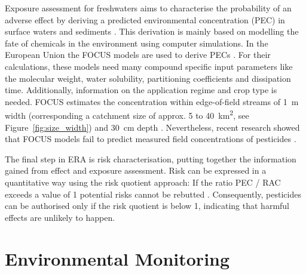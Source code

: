 Exposure assessment for freshwaters aims to characterise the probability of an adverse effect by deriving a predicted environmental concentration (PEC) in surface waters and sediments \citep{newman_fundamentals_2015}. 
This derivation is mainly based on modelling the fate of chemicals in the environment using computer simulations. 
In the European Union the FOCUS models are used to derive PECs \citep{focus_focus_2001, efsa_guidance_2013}.
For their calculations, these models need many compound specific input parameters like the molecular weight, water solubility, partitioning coefficients and dissipation time. 
Additionally, information on the application regime and crop type is needed. 
FOCUS estimates the concentration within edge-of-field streams of 1~m width (corresponding a catchment size of approx. 5 to 40~km\textsuperscript{2}, see Figure~\ref{fig:size_width}) and 30~cm depth \citep{erlacher_regulation_2011}. 
Nevertheless, recent research showed that FOCUS models fail to predict measured field concentrations of pesticides \citep{knabel_regulatory_2012, knabel_fungicide_2014}. 

The final step in ERA is risk characterisation, putting together the information gained from effect and exposure assessment. 
Risk can be expressed in a quantitative way using the risk quotient approach: If the ratio PEC / RAC exceeds a value of 1 potential risks cannot be rebutted \citep{efsa_guidance_2013, suter_ecological_2007,  solomon_probabilistic_2000}. 
Consequently, pesticides can be authorised only if the risk quotient is below 1, indicating that harmful effects are unlikely to happen.



\section{Environmental Monitoring}


